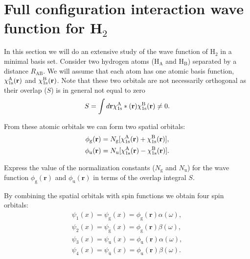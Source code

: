 \documentclass[../Main/chem532-notes.tex]{subfiles}
\begin{document}
\section{Full configuration interaction wave function for H$_2$}
In this section we will do an extensive study of the wave function of H$_2$ in a minimal basis set.
Consider two hydrogen atoms (H$_\mathrm{A}$ and H$_\mathrm{B}$) separated by a distance $R_\mathrm{AB}$.
We will assume that each atom has one atomic basis function, $\chi_{1\rm s}^{\rm A}(\mathbf{r})$ and $\chi_{1\rm s}^{\rm B}(\mathbf{r})$.
Note that these two orbitals are not necessarily orthogonal as their overlap ($S$) is in general not equal to zero
\begin{equation}
S = \int d\mathbf{r} \chi_{1\rm s}^{\rm A}*(\mathbf{r}) \chi_{1\rm s}^{\rm B}(\mathbf{r}) \neq 0.
\end{equation}


From these atomic orbitals we can form two spatial orbitals:
\begin{align}
\phi_{\mathrm{g}}(\mathbf{r}) &= N_\mathrm{g} [\chi_{1\rm s}^{\rm A}(\mathbf{r}) + \chi_{1\rm s}^{\rm B}(\mathbf{r})],\\
\phi_{\mathrm{u}}(\mathbf{r}) &= N_\mathrm{u} [\chi_{1\rm s}^{\rm A}(\mathbf{r}) - \chi_{1\rm s}^{\rm B}(\mathbf{r})].
\end{align}

\begin{problem}
Express the value of the normalization constants ($N_\mathrm{g}$ and $N_\mathrm{u}$) for the wave function $\phi_{\mathrm{g}}(\mathbf{r})$ and $\phi_{\mathrm{u}}(\mathbf{r})$ in terms of the overlap integral $S$. 
\end{problem}

By combining the spatial orbitals with spin functions we obtain four spin orbitals:
\begin{align}
\psi_1(x) = \psi_{\mathrm{g}}(x) = \phi_{\mathrm{g}}(\mathbf{r}) \alpha(\omega),\\
\psi_2(x) = \psi_{\bar{\mathrm{g}}}(x) = \phi_{\mathrm{g}}(\mathbf{r}) \beta(\omega),\\
\psi_3(x) = \psi_{\mathrm{u}}(x) = \phi_{\mathrm{u}}(\mathbf{r}) \alpha(\omega),\\
\psi_4(x) = \psi_{\bar{\mathrm{u}}}(x) = \phi_{\mathrm{u}}(\mathbf{r}) \beta(\omega).
\end{align}
\end{document}
